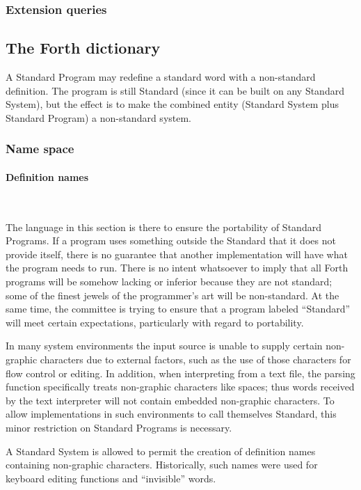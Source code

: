 \cbstart
\subsubsection{Extension queries} %
\cbend

\subsection{The Forth dictionary} %

A Standard Program may redefine a standard word with a non-standard
definition. The program is still Standard (since it can be built on
any Standard System), but the effect is to make the combined entity
(Standard System plus Standard Program) a non-standard system.

\subsubsection{Name space} %

\setcounter{paragraph}{1}
\paragraph{Definition names} ~ %

The language in this section is there to ensure the portability of
Standard Programs. If a program uses something outside the Standard
that it does not provide itself, there is no guarantee that another
implementation will have what the program needs to run. There is no
intent whatsoever to imply that all Forth programs will be somehow
lacking or inferior because they are not standard; some of the finest
jewels of the programmer's art will be non-standard. At the same time,
the committee is trying to ensure that a program labeled ``Standard''
will meet certain expectations, particularly with regard to portability.

In many system environments the input source is unable to supply
certain non-graphic characters due to external factors, such as the
use of those characters for flow control or editing. In addition,
when interpreting from a text file, the parsing function specifically
treats non-graphic characters like spaces; thus words received by the
text interpreter will not contain embedded non-graphic characters. To
allow implementations in such environments to call themselves Standard,
this minor restriction on Standard Programs is necessary.

A Standard System is allowed to permit the creation of definition
names containing non-graphic characters. Historically, such names
were used for keyboard editing functions and ``invisible'' words.

